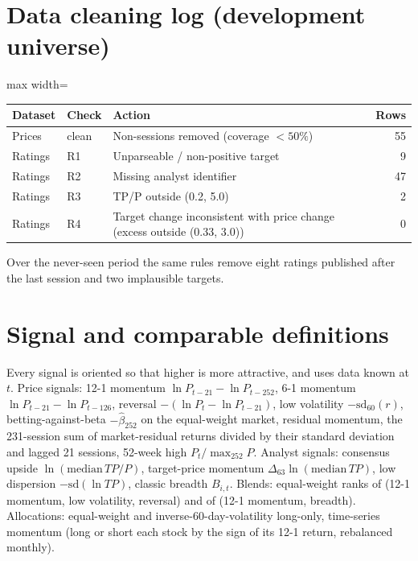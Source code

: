 \section{Data cleaning log (development universe)}\label{app:cleaning}

\begin{table}[h]
\centering\small
\begin{adjustbox}{max width=\textwidth}\begin{tabular}{lllr}
\toprule
Dataset & Check & Action & Rows\\
\midrule
Prices & clean & Non-sessions removed (coverage $<50\%$) & 55\\
Ratings & R1 & Unparseable / non-positive target & 9\\
Ratings & R2 & Missing analyst identifier & 47\\
Ratings & R3 & TP/P outside (0.2, 5.0) & 2\\
Ratings & R4 & Target change inconsistent with price change (excess outside (0.33, 3.0)) & 0\\
\bottomrule
\end{tabular}\end{adjustbox}
\par\smallskip\begin{minipage}{0.9\textwidth}\footnotesize Over the never-seen period the same rules remove eight ratings published after the last session and two implausible targets.\end{minipage}
\end{table}

\section{Signal and comparable definitions}\label{app:defs}

Every signal is oriented so that higher is more attractive, and uses data known at $t$. Price signals: 12-1 momentum $\ln P_{t-21}-\ln P_{t-252}$, 6-1 momentum $\ln P_{t-21}-\ln P_{t-126}$, reversal $-(\ln P_t-\ln P_{t-21})$, low volatility $-\mathrm{sd}_{60}(r)$, betting-against-beta $-\hat\beta_{252}$ on the equal-weight market, residual momentum, the 231-session sum of market-residual returns divided by their standard deviation and lagged 21 sessions, 52-week high $P_t/\max_{252}P$. Analyst signals: consensus upside $\ln(\mathrm{median}\,TP/P)$, target-price momentum $\Delta_{63}\ln(\mathrm{median}\,TP)$, low dispersion $-\mathrm{sd}(\ln TP)$, classic breadth $B_{i,t}$. Blends: equal-weight ranks of (12-1 momentum, low volatility, reversal) and of (12-1 momentum, breadth). Allocations: equal-weight and inverse-60-day-volatility long-only, time-series momentum (long or short each stock by the sign of its 12-1 return, rebalanced monthly).

